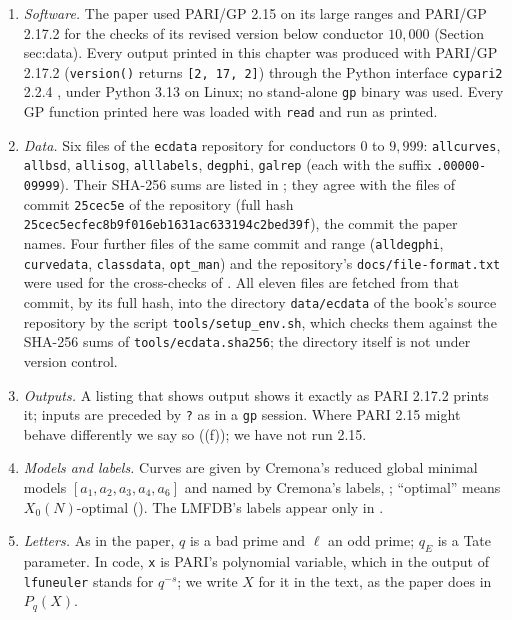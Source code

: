 \begin{sloppypar}
\begin{convention}\label{conv:computation:versions}
\begin{enumerate}[label=(\alph*)]
\item \emph{Software.} The paper used PARI/GP 2.15 \cite{PARI} on its large ranges and PARI/GP 2.17.2 \cite{PARI217} for the checks of its
revised version below conductor $10{,}000$ (Section sec:data). Every output printed in this chapter was produced with PARI/GP 2.17.2
(\texttt{version()} returns \texttt{[2, 17, 2]}) through the Python interface \texttt{cypari2} 2.2.4 \cite{cypari2}, under Python 3.13 on
Linux; no stand-alone \texttt{gp} binary was used. Every GP function printed here was loaded with \texttt{read} and run as printed.
\item \emph{Data.} Six files of the \texttt{ecdata} repository \cite{ecdata} for conductors $0$ to $9{,}999$:
\texttt{allcurves}, \texttt{allbsd}, \texttt{allisog}, \texttt{alllabels}, \texttt{degphi}, \texttt{galrep} (each with the suffix
\texttt{.00000-09999}). Their SHA-256 sums are listed in ; they agree with the files of commit
\texttt{25cec5e} of the repository (full hash \texttt{25cec5ecfec8b9f016eb1631ac633194c2bed39f}), the commit the
paper names. Four further files of the same commit and range (\texttt{alldegphi}, \texttt{curvedata}, \texttt{classdata},
\texttt{opt\_man}) and the repository's \texttt{docs/\allowbreak file-format.txt} were used for the cross-checks of .
All eleven files are fetched from that commit, by its full hash, into the directory \texttt{data/ecdata} of the book's source repository by the
script \texttt{tools/setup\_env.sh}, which checks them against the SHA-256 sums of \texttt{tools/ecdata.sha256}; the directory itself is not
under version control.
\item \emph{Outputs.} A listing that shows output shows it exactly as PARI 2.17.2 prints it; inputs are preceded by \texttt{?} as in a
\texttt{gp} session. Where PARI 2.15 might behave differently we say so ((f)); we have not run 2.15.
\item \emph{Models and labels.} Curves are given by Cremona's reduced global minimal models $[a_1,a_2,a_3,a_4,a_6]$ and named by Cremona's
labels, ; ``optimal'' means $X_0(N)$-optimal (). The LMFDB's labels appear only in
.
\item \emph{Letters.} As in the paper, $q$ is a bad prime and $\ell$ an odd prime; $q_E$ is a Tate parameter. In code, \texttt{x} is
PARI's polynomial variable, which in the output of \texttt{lfuneuler} stands for $q^{-s}$; we write $X$ for it in the text, as the paper
does in $P_q(X)$.
\end{enumerate}
\end{convention}


\end{sloppypar}
